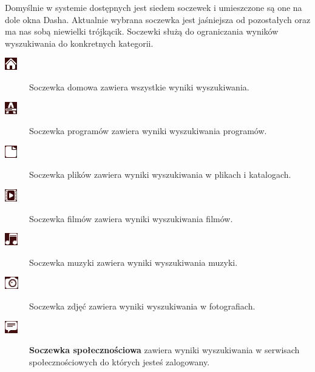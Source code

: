 Domyślnie w systemie dostępnych jest siedem soczewek i umieszczone są one na dole okna Dasha. Aktualnie wybrana soczewka jest jaśniejsza od pozostałych oraz ma nas sobą niewielki trójkącik. Soczewki służą do ograniczania wyników wyszukiwania do konkretnych kategorii.
\begin{description}
\item[\includegraphics{images/unity_dash_lens_home.png}] \textcolor{ubuntu_orange}{Soczewka domowa} zawiera wszystkie wyniki wyszukiwania. 
\item[\includegraphics{images/unity_dash_lens_programy.png}]\textcolor{ubuntu_orange}{Soczewka programów} zawiera wyniki wyszukiwania programów.
\item[\includegraphics{images/unity_dash_lens_pliki.png}] \textcolor{ubuntu_orange}{Soczewka plików} zawiera wyniki wyszukiwania w plikach i katalogach.
\item[\includegraphics{images/unity_dash_lens_video.png}] \textcolor{ubuntu_orange}{Soczewka filmów} zawiera wyniki wyszukiwania filmów.
\item[\includegraphics{images/unity_dash_lens_audio.png}] \textcolor{ubuntu_orange}{Soczewka muzyki} zawiera wyniki wyszukiwania muzyki.
\item[\includegraphics{images/unity_dash_lens_photo.png}] \textcolor{ubuntu_orange}{Soczewka zdjęć} zawiera wyniki wyszukiwania w fotografiach.
\item[\includegraphics{images/unity_dash_lens_social.png}] \textbf{Soczewka społecznościowa} zawiera wyniki wyszukiwania w serwisach społecznościowych do których jesteś zalogowany.
\end{description}

